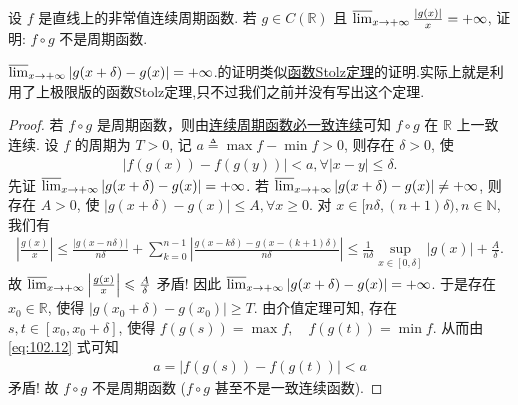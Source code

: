 \documentclass[../../main.tex]{subfiles}%
\begin{document}
\begin{example}
设 $f$ 是直线上的非常值连续周期函数. 若 $g \in C(\mathbb{R})$ 且 $\varlimsup_{x \to +\infty} \frac{|g(x)|}{x} = +\infty$, 证明: $f \circ g$ 不是周期函数.
\end{example}
\begin{note}
$\varlimsup_{x \to +\infty} |g(x + \delta) - g(x)| = +\infty$.的证明类似\hyperref[theorem:函数Stolz定理]{函数Stolz定理}的证明.实际上就是利用了上极限版的函数Stolz定理,只不过我们之前并没有写出这个定理.
\end{note}
\begin{proof}
若 $f \circ g$ 是周期函数，则由\hyperref[proposition:连续周期函数必一致连续]{连续周期函数必一致连续}可知 $f \circ g$ 在 $\mathbb{R}$ 上一致连续.
设 $f$ 的周期为 $T > 0$, 记 $a \triangleq \max f - \min f > 0$, 则存在 $\delta > 0$, 使
\begin{align}
|f(g(x)) - f(g(y))| < a, \forall |x - y| \leqslant \delta. \label{eq:102.12}
\end{align}
先证 $\varlimsup_{x \to +\infty} |g(x + \delta) - g(x)| = +\infty$. 若 $\varlimsup_{x \to +\infty} |g(x + \delta) - g(x)| \ne +\infty$, 则存在 $A > 0$, 使
$|g(x + \delta) - g(x)| \leqslant A, \forall x \geqslant 0.$
对 $x \in [n\delta, (n + 1)\delta), n \in \mathbb{N}$, 我们有
\begin{align*}
\left| \frac{g(x)}{x} \right| \leqslant \frac{|g(x - n\delta)|}{n\delta} + \sum_{k=0}^{n - 1} \left| \frac{g(x - k\delta) - g(x - (k + 1)\delta)}{n\delta} \right| \leqslant \frac{1}{n\delta} \sup_{x \in [0, \delta]} |g(x)| + \frac{A}{\delta}.
\end{align*}
故 $\varlimsup_{x \to +\infty} \left| \frac{g(x)}{x} \right| \leqslant \frac{A}{\delta}$ 矛盾! 因此 $\varlimsup_{x \to +\infty} |g(x + \delta) - g(x)| = +\infty$.
于是存在 $x_0 \in \mathbb{R}$, 使得 $|g(x_0 + \delta) - g(x_0)| \geqslant T$. 由介值定理可知, 存在 $s, t \in [x_0, x_0 + \delta]$, 使得
$f(g(s)) = \max f, \quad f(g(t)) = \min f.$
从而由 \eqref{eq:102.12} 式可知
\begin{align*}
a = |f(g(s)) - f(g(t))| < a
\end{align*}
矛盾! 故 $f \circ g$ 不是周期函数 ($f \circ g$ 甚至不是一致连续函数).
\end{proof}
\end{document}
